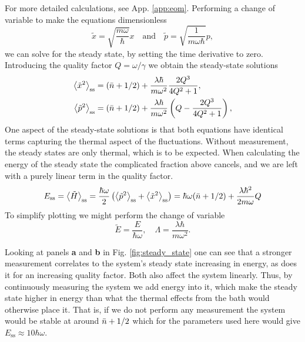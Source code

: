 For more detailed calculations, see App. \ref{app:eom}. Performing a change of variable to make the equations dimensionless
\begin{equation}
    \tilde{x} = \sqrt{\frac{m\omega}{\hbar}} x \quad \text{and} \quad \tilde{p} = \sqrt{\frac{1}{m \omega \hbar}} p ,
\end{equation}
we can solve for the steady state, by setting the time derivative to zero. Introducing the quality factor $Q = \omega / \gamma$ we obtain the steady-state solutions
\begin{align}
    \expval{\tilde{x}^2}_\mathrm{ss} &= (\bar{n} + 1/2) + \frac{\lambda \hbar}{m \omega^2} \frac{2 Q^3}{4Q^2 + 1}, \label{eq:x2ss}\\
    \expval{\tilde{p}^2}_\mathrm{ss} &= (\bar{n} + 1/2) + \frac{\lambda \hbar}{m \omega^2} \left( Q - \frac{2Q^3}{4Q^2 + 1} \right) \label{eq:p2ss},
\end{align}
One aspect of the steady-state solutions is that both equations have identical terms capturing the thermal aspect of the fluctuations. Without measurement, the steady states are only thermal, which is to be expected. When calculating the energy of the steady state the complicated fraction above cancels, and we are left with a purely linear term in the quality factor.
\begin{equation}
    E_\mathrm{ss} = \expval{\tilde{H}}_\mathrm{ss} = \frac{\hbar \omega}{2} \left( \expval{\tilde{p}^2}_\text{ss} + \expval{\tilde{x}^2}_\text{ss} \right) = \hbar\omega (\bar{n} + 1/2)+ \frac{\lambda \hbar^2}{2 m\omega} Q
    \label{eq:ess}
\end{equation}
To simplify plotting we might perform the change of variable
\begin{equation}
    \tilde{E} =\frac{E}{\hbar\omega}, \quad \Lambda = \frac{\lambda \hbar}{m \omega^2}.
\end{equation}



Looking at panels \textbf{a} and \textbf{b} in Fig. \ref{fig:steady_state} one can see that a stronger measurement correlates to the system's steady state increasing in energy, as does it for an increasing quality factor. Both also affect the system linearly. Thus, by continuously measuring the system we add energy into it, which make the steady state higher in energy than what the thermal effects from the bath would otherwise place it. That is, if we do not perform any measurement the system would be stable at around $\bar{n} + 1/2$ which for the parameters used here would give $E_\text{ss} \approx 10\hbar\omega$.

